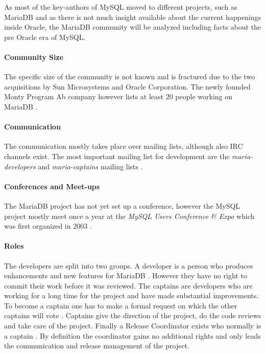 As most of the key-authors of MySQL moved to different projects, such as
MariaDB and as there is not much insight available about the current happenings
inside Oracle, the MariaDB community will be analyzed including facts about the
pre Oracle era of MySQL.

\paragraph{Community Size}

The specific size of the community is not known and is fractured due to
the two acquisitions by Sun Microsystems and Oracle Corporation. The newly
founded Monty Program Ab company however lists at least 20 people working on
MariaDB \cite{MySQLBehind}.

\paragraph{Communication}

The communication mostly takes place over mailing lists, although also \ac{IRC}
channels exist. The most important mailing list for development are the
\emph{maria-developers} and \emph{maria-captains} mailing lists
\cite{MySQLDevelopers}.

\paragraph{Conferences and Meet-ups}

The MariaDB project has not yet set up a conference, however the MySQL project
mostly meet once a year at the \emph{MySQL Users Conference \& Expo} which was
first organized in 2003 \cite{MySQLConference}.

\paragraph{Roles}

The developers are split into two groups. A developer is a person who produces
enhancements and new features for MariaDB
\cite{MySQLContributingCode,MySQLContributing,MySQLCaptain}. However they have
no right to commit their work before it was reviewed. The captains are
developers who are working for a long time for the project and have made
substantial improvements. To become a captain one has to make a formal request
on which the other captains will vote \cite{MySQLCaptain}. Captains give the
direction of the project, do the code reviews and take care of the project.
Finally a Release Coordinator exists who normally is a captain
\cite{MySQLReleaseCoordinator}. By definition the coordinator gains no
additional rights and only leads the communication and release management of
the project.

